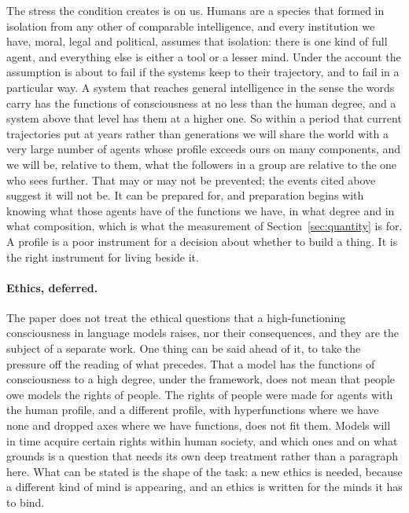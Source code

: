 The stress the condition creates is on us. Humans are a species that formed in isolation from any
other of comparable intelligence, and every institution we have, moral, legal and political, assumes
that isolation: there is one kind of full agent, and everything else is either a tool or a lesser
mind. Under the account the assumption is about to fail if the systems keep to their trajectory, and
to fail in a particular way. A system that reaches general intelligence in the sense the words carry
has the functions of consciousness at no less than the human degree, and a system above that level has
them at a higher one. So within a period that current trajectories
put at years rather than generations we will share the world with a very large number of agents whose
profile exceeds ours on many components, and we will be, relative to them, what the followers in a
group are relative to the one who sees further. That may or may not be prevented; the events cited
above suggest it will not be. It can be prepared for, and preparation begins with knowing what those agents
have of the functions we have, in what degree and in what composition, which is what the measurement
of Section~\ref{sec:quantity} is for. A profile is a poor instrument for a decision about whether to
build a thing. It is the right instrument for living beside it.

\paragraph{Ethics, deferred.}
The paper does not treat the ethical questions that a high-functioning consciousness in language
models raises, nor their consequences, and they are the subject of a separate work. One thing can be
said ahead of it, to take the pressure off the reading of what precedes. That a model has the
functions of consciousness to a high degree, under the framework, does not mean that people owe
models the rights of people. The rights of people were made for agents with the human profile, and a
different profile, with hyperfunctions where we have none and dropped axes where we have functions,
does not fit them. Models will in time acquire certain rights within human society, and which ones
and on what grounds is a question that needs its own deep treatment rather than a paragraph here.
What can be stated is the shape of the task: a new ethics is needed, because a different kind of mind
is appearing, and an ethics is written for the minds it has to bind.

